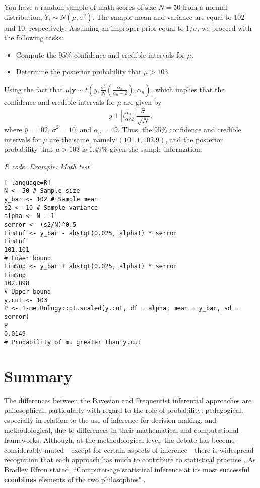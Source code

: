 You have a random sample of math scores of size $N = 50$ from a normal distribution, $Y_i \sim N(\mu, \sigma^2)$. The sample mean and variance are equal to $102$ and $10$, respectively. Assuming an improper prior equal to $1/\sigma$, we proceed with the following tasks:

\begin{itemize}
	\item Compute the 95\% confidence and credible intervals for $\mu$.
	\item Determine the posterior probability that $\mu > 103$.
\end{itemize}

Using the fact that $\mu | \mathbf{y} \sim t\left(\bar{y}, \frac{\hat{\sigma}^2}{N} \left( \frac{\alpha_n}{\alpha_n - 2} \right), \alpha_n \right)$, which implies that the confidence and credible intervals for $\mu$ are given by 
\[
\bar{y} \pm |t_{\alpha/2}^{\alpha_n}| \frac{\hat{\sigma}}{\sqrt{N}},
\]
where $\bar{y} = 102$, $\hat{\sigma}^2 = 10$, and $\alpha_n = 49$. Thus, the 95\% confidence and credible intervals for $\mu$ are the same, namely $(101.1, 102.9)$, and the posterior probability that $\mu > 103$ is $1.49\%$ given the sample information.

\begin{tcolorbox}[enhanced,width=4.67in,center upper,
	fontupper=\large\bfseries,drop shadow southwest,sharp corners]
	\textit{R code. Example: Math test}
\begin{VF}
\begin{lstlisting}[ language=R]
N <- 50 # Sample size
y_bar <- 102 # Sample mean
s2 <- 10 # Sample variance
alpha <- N - 1
serror <- (s2/N)^0.5 
LimInf <- y_bar - abs(qt(0.025, alpha)) * serror
LimInf
101.101
# Lower bound
LimSup <- y_bar + abs(qt(0.025, alpha)) * serror
LimSup
102.898
# Upper bound
y.cut <- 103
P <- 1-metRology::pt.scaled(y.cut, df = alpha, mean = y_bar, sd = serror)
P
0.0149
# Probability of mu greater than y.cut
\end{lstlisting}
\end{VF}
\end{tcolorbox}



\section{Summary}\label{sec27}

The differences between the Bayesian and Frequentist inferential approaches are philosophical, particularly with regard to the role of probability; pedagogical, especially in relation to the use of inference for decision-making; and methodological, due to differences in their mathematical and computational frameworks. Although, at the methodological level, the debate has become considerably muted—except for certain aspects of inference—there is widespread recognition that each approach has much to contribute to statistical practice \cite{Good1992, Bayarri2004, Kass2011}. As Bradley Efron stated, ``Computer-age statistical inference at its most successful \textbf{combines} elements of the two philosophies" \cite{efron2016computer}.

